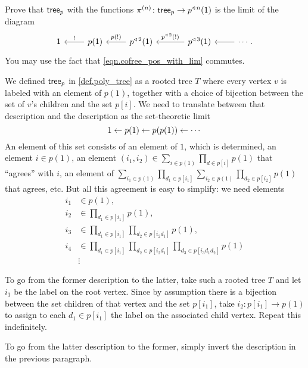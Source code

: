 \documentclass[Book-Poly]{subfiles}
\begin{document}
\begin{exercise}\label{exc.tree_as_limit}
Prove that $\mathsf{tree}_p$ with the functions $\pi^{(n)}\colon\mathsf{tree}_p\to p^{\mathbin{\triangleleft}\,n}(\textsf{1})$ is the limit of the diagram
\begin{equation} \label{eqn.cofree_pos_diagram}
\begin{tikzcd}
    \1 &
	p(\1) \ar[l, "!"'] &
	p\tripow2(\1) \ar[l, "p(!)"'] &
 	[10pt]
	p\tripow3(\1) \ar[l, "p\tripow2(!)"'] &
	\cdots.\ar[l]
\end{tikzcd}
\end{equation}
You may use the fact that \eqref{eqn.cofree_pos_with_lim} commutes.
\begin{solution}
We defined $\mathsf{tree}_p$ in \cref{def.poly_tree} as a rooted tree $T$ where every vertex $v$ is labeled with an element of $p(1)$, together with a choice of bijection between the set of $v$'s children and the set $p[i]$. We need to translate between that description and the description as the set-theoretic limit
\[
1\leftarrow p(1)\leftarrow p(p(1))\leftarrow\cdots
\]
An element of this set consists of an element of $1$, which is determined, an element $i\in p(1)$, an element $(i_1,i_2)\in\sum_{i\in p(1)}\prod_{d\in p[i]}p(1)$ that ``agrees'' with $i$, an element of $\sum_{i_1\in p(1)}\prod_{d_1\in p[i_1]}\sum_{i_2\in p(1)}\prod_{d_2\in p[i_2]}p(1)$ that agrees, etc. But all this agreement is easy to simplify: we need elements
\begin{align*}
	 i_1&\in p(1),\\
	 i_2&\in\prod_{d_1\in p[i_1]}p(1),\\
	 i_3&\in \prod_{d_1\in p[i_1]}\prod_{d_2\in p[i_2 d_1]}p(1),\\
	 i_4&\in\prod_{d_1\in p[i_1]}\prod_{d_2\in p[i_2 d_1]}\prod_{d_3\in p[i_3 d_1 d_2]}p(1)\\
	 &\vdots
\end{align*}

To go from the former description to the latter, take such a rooted tree $T$ and let $i_1$ be the label on the root vertex. Since by assumption there is a bijection between the set children of that vertex and the set $p[i_1]$, take $i_2\colon p[i_1]\to p(1)$ to assign to each $d_1\in p[i_1]$ the label on the associated child vertex. Repeat this indefinitely.

To go from the latter description to the former, simply invert the description in the previous paragraph.
\end{solution}
\end{exercise}
\end{document}
